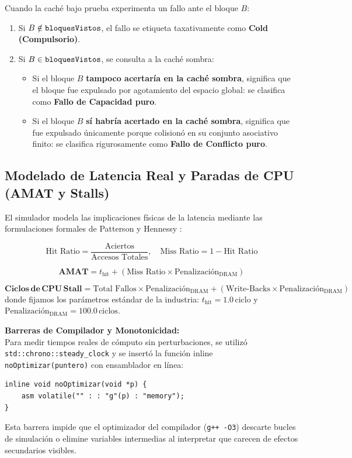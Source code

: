 \documentclass[11pt,letterpaper]{article}
\begin{document}
Cuando la caché bajo prueba experimenta un fallo ante el bloque $B$:
\begin{enumerate}
    \item Si $B \notin \text{\texttt{bloquesVistos}}$, el fallo se etiqueta taxativamente como \textbf{Cold (Compulsorio)}.
    \item Si $B \in \text{\texttt{bloquesVistos}}$, se consulta a la caché sombra:
    \begin{itemize}
        \item Si el bloque $B$ \textbf{tampoco acertaría en la caché sombra}, significa que el bloque fue expulsado por agotamiento del espacio global: se clasifica como \textbf{Fallo de Capacidad puro}.
        \item Si el bloque $B$ \textbf{sí habría acertado en la caché sombra}, significa que fue expulsado únicamente porque colisionó en su conjunto asociativo finito: se clasifica rigurosamente como \textbf{Fallo de Conflicto puro}.
    \end{itemize}
\end{enumerate}

\subsection{Modelado de Latencia Real y Paradas de CPU (AMAT y Stalls)}
El simulador modela las implicaciones físicas de la latencia mediante las formulaciones formales de Patterson y Hennessy \cite{hennessy2011computer}:

\begin{equation}
    \text{Hit Ratio} = \frac{\text{Aciertos}}{\text{Accesos Totales}}, \quad \text{Miss Ratio} = 1 - \text{Hit Ratio}
\end{equation}

\begin{equation}
    \mathbf{AMAT} = t_{\text{hit}} + (\text{Miss Ratio} \times \text{Penalización}_{\text{DRAM}})
\end{equation}

\begin{equation}
    \mathbf{Ciclos\,de\,CPU\,Stall} = \text{Total Fallos} \times \text{Penalización}_{\text{DRAM}} + (\text{Write-Backs} \times \text{Penalización}_{\text{DRAM}})
\end{equation}
donde fijamos los parámetros estándar de la industria: $t_{\text{hit}} = 1.0\,\text{ciclo}$ y $\text{Penalización}_{\text{DRAM}} = 100.0\,\text{ciclos}$.

\noindent\textbf{Barreras de Compilador y Monotonicidad:}\\
Para medir tiempos reales de cómputo sin perturbaciones, se utilizó \texttt{std::chrono::steady\_clock} y se insertó la función inline \texttt{noOptimizar(puntero)} con ensamblador en línea:
\begin{lstlisting}[caption={Barrera de optimización del compilador.}, label={lst:barrier}]
inline void noOptimizar(void *p) {
    asm volatile("" : : "g"(p) : "memory");
}
\end{lstlisting}
Esta barrera impide que el optimizador del compilador (\texttt{g++ -O3}) descarte bucles de simulación o elimine variables intermedias al interpretar que carecen de efectos secundarios visibles.
\end{document}
